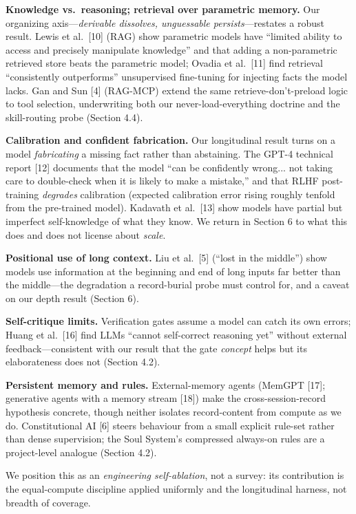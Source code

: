 \documentclass[11pt]{article}
\begin{document}
\textbf{Knowledge vs.\ reasoning; retrieval over parametric memory.} Our organizing axis---\emph{derivable
dissolves, unguessable persists}---restates a robust result. Lewis et al.\
[10] (RAG) show parametric models have ``limited ability to access and precisely
manipulate knowledge'' and that adding a non-parametric retrieved store beats the
parametric model; Ovadia et al.\ [11] find retrieval ``consistently outperforms''
unsupervised fine-tuning for injecting facts the model lacks. Gan and Sun [4] (RAG-MCP)
extend the same retrieve-don't-preload logic to tool selection, underwriting both our
never-load-everything doctrine and the skill-routing probe (Section 4.4).

\textbf{Calibration and confident fabrication.} Our longitudinal result turns on a model
\emph{fabricating} a missing fact rather than abstaining. The GPT-4 technical report [12]
documents that the model ``can be confidently wrong... not taking care to double-check
when it is likely to make a mistake,'' and that RLHF post-training \emph{degrades} calibration
(expected calibration error rising roughly tenfold from the pre-trained model). Kadavath
et al.\ [13] show models have partial but imperfect self-knowledge of what they know. We
return in Section 6 to what this does and does not license about \emph{scale}.

\textbf{Positional use of long context.} Liu et al.\ [5] (``lost in the middle'') show models
use information at the beginning and end of long inputs far better than the middle---the
degradation a record-burial probe must control for, and a caveat on our depth result
(Section 6).

\textbf{Self-critique limits.} Verification gates assume a model can catch its own errors;
Huang et al.\ [16] find LLMs ``cannot self-correct reasoning yet'' without external
feedback---consistent with our result that the gate \emph{concept} helps but its
elaborateness does not (Section 4.2).

\textbf{Persistent memory and rules.} External-memory agents (MemGPT [17]; generative agents
with a memory stream [18]) make the cross-session-record hypothesis concrete, though
neither isolates record-content from compute as we do. Constitutional AI [6] steers
behaviour from a small explicit rule-set rather than dense supervision; the Soul
System's compressed always-on rules are a project-level analogue (Section 4.2).

We position this as an \emph{engineering self-ablation}, not a survey: its contribution is
the equal-compute discipline applied uniformly and the longitudinal harness, not breadth
of coverage.
\end{document}
